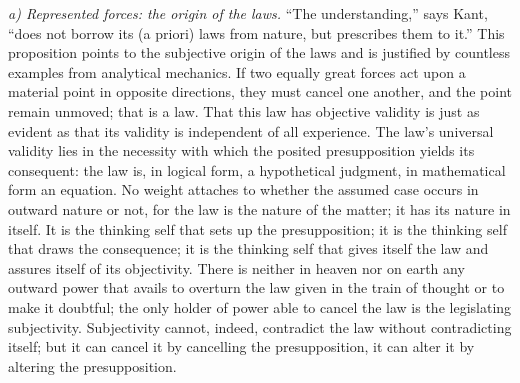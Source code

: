 \documentclass[12pt,a4paper]{book}
\newcommand{\runin}[1]{\emph{#1}\hspace{0.4em}}
\begin{document}
\runin{a) Represented forces: the origin of the laws.}%
``The understanding,'' says Kant, ``does not borrow its (a priori) laws from
nature, but prescribes them to it.'' This proposition points to the subjective
origin of the laws and is justified by countless examples from analytical mechanics.
If two equally great forces act upon a material point in opposite directions, they
must cancel one another, and the point remain unmoved; that is a law. That this law
has objective validity is just as evident as that its validity is independent of all
experience. The law's universal validity lies in the necessity with which the
posited presupposition yields its consequent: the law is, in logical form, a
hypothetical judgment, in mathematical form an equation. No weight attaches to
whether the assumed case occurs in outward nature or not, for the law is the nature
of the matter; it has its nature in itself. It is the thinking self that sets up the
presupposition; it is the thinking self that draws the consequence; it is the
thinking self that gives itself the law and assures itself of its objectivity.
There is neither in heaven nor on earth any outward power that avails to overturn
the law given in the train of thought or to make it doubtful; the only holder of
power able to cancel the law is the legislating subjectivity. Subjectivity cannot,
indeed, contradict the law without contradicting itself; but it can cancel it by
cancelling the presupposition, it can alter it by altering the presupposition.
\end{document}
